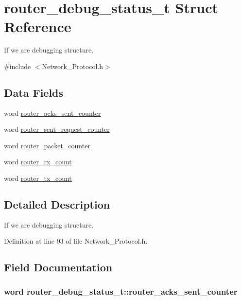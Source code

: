 \hypertarget{structrouter__debug__status__t}{\section{router\-\_\-debug\-\_\-status\-\_\-t Struct Reference}
\label{structrouter__debug__status__t}
}


If we are debugging structure.  




{\ttfamily \#include $<$Network\-\_\-\-Protocol.\-h$>$}

\subsection*{Data Fields}
\begin{DoxyCompactItemize}
\item 
word \hyperlink{structrouter__debug__status__t_aab2109830ddad23e1dd38843e0a5d081}{router\-\_\-acks\-\_\-sent\-\_\-counter}
\item 
word \hyperlink{structrouter__debug__status__t_a541c3cf0fdae35ca720292c970d50d80}{router\-\_\-sent\-\_\-request\-\_\-counter}
\item 
word \hyperlink{structrouter__debug__status__t_a6b8870662b1b6101fae1f02affaacba2}{router\-\_\-packet\-\_\-counter}
\item 
word \hyperlink{structrouter__debug__status__t_a3df592dbcfba21944aed494410a50c7b}{router\-\_\-rx\-\_\-count}
\item 
word \hyperlink{structrouter__debug__status__t_a4072b48ecc482dfd9f9116d9eed25c73}{router\-\_\-tx\-\_\-count}
\end{DoxyCompactItemize}


\subsection{Detailed Description}
If we are debugging structure. 

Definition at line 93 of file Network\-\_\-\-Protocol.\-h.



\subsection{Field Documentation}
\hypertarget{structrouter__debug__status__t_aab2109830ddad23e1dd38843e0a5d081}{
\subsubsection[{router\-\_\-acks\-\_\-sent\-\_\-counter}]{\setlength{\rightskip}{0pt plus 5cm}word router\-\_\-debug\-\_\-status\-\_\-t\-::router\-\_\-acks\-\_\-sent\-\_\-counter}}\label{structrouter__debug__status__t_aab2109830ddad23e1dd38843e0a5d081}


